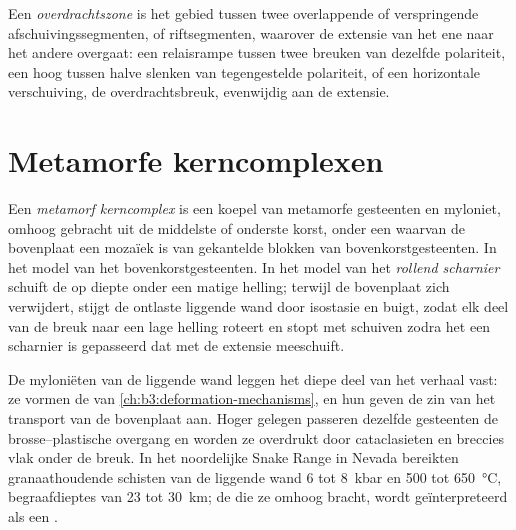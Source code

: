 \begin{definition}[Overdrachtszone]\label{def:b3:extension-strike-slip:transfer}
Een \emph{overdrachtszone} is het gebied tussen twee
overlappende of verspringende afschuivingssegmenten, of riftsegmenten, waarover de extensie van het ene
naar het andere overgaat: een relaisrampe tussen twee breuken van dezelfde polariteit, een hoog tussen
halve slenken van tegengestelde polariteit, of een horizontale verschuiving, de overdrachtsbreuk,
evenwijdig aan de extensie.
\end{definition}

\section{Metamorfe kerncomplexen}\label{sec:b3:extension-strike-slip:core}

\begin{definition}\label{def:b3:extension-strike-slip:core-complex}
Een \emph{metamorf kerncomplex} is een koepel van metamorfe gesteenten en
myloniet, omhoog gebracht uit de middelste of onderste korst, onder een  waarvan de
bovenplaat een mozaïek is van gekantelde blokken van bovenkorstgesteenten. In het model van het
bovenkorstgesteenten. In het model van het \emph{rollend scharnier}
schuift de  op diepte onder een matige helling; terwijl de bovenplaat zich verwijdert,
stijgt de ontlaste liggende wand door isostasie en buigt, zodat elk deel van de breuk
naar een lage helling roteert en stopt met schuiven zodra het een
scharnier is gepasseerd dat met de extensie meeschuift.
\end{definition}

De myloniëten van de liggende wand leggen het diepe deel van het verhaal vast: ze vormen
de  van \cref{ch:b3:deformation-mechanisms}, en hun  geven de zin van het transport van de bovenplaat aan. Hoger gelegen passeren
dezelfde gesteenten de brosse--plastische overgang en worden ze overdrukt door
cataclasieten en breccies vlak onder de breuk. In het noordelijke Snake Range
in Nevada bereikten granaathoudende schisten van de liggende wand 6 tot \qty{8}{kbar}
en 500 tot \qty{650}{\celsius}, begraafdieptes van 23 tot \qty{30}{km}; de
 die ze omhoog bracht, wordt geïnterpreteerd als een .

